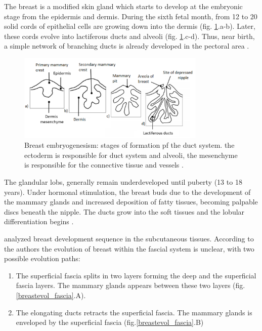 \label{section:background:introduction}
\label{section:breastanatomy}
 


The breast is a modified skin gland which starts to develop at the embryonic stage from the epidermis and dermis.  During the sixth fetal month, from 12 to 20 solid cords of epithelial cells are growing down into the dermis (fig. \ref{breastembryogenesis}.a-b). Later, these cords evolve into lactiferous ducts and alveoli (fig. \ref{breastembryogenesis}.c-d). Thus, near birth, a simple network of branching ducts is already developed in the pectoral area \citep{skandalakis_embryology_2009}.
 

 \begin{figure}[!h]
 \centering
\includegraphics[width=0.8\textwidth,keepaspectratio]{figures/breast_evolution_my.png} 
\caption[Breast embryogenesis: embryonic evolution of duct system. The epidermis is responsible for the creation of ductal system and alveoli, the dermis mesenchyme is responsible for the creation of connective tissue and vessels] {Breast embryogenesism: stages of formation pf the duct system. the ectoderm is responsible for duct system and alveoli, the mesenchyme is responsible for the connective tissue and vessels \citep{skandalakis_embryology_2009}.}
\label{breastembryogenesis}
\end{figure}


The glandular lobs, generally remain underdeveloped until puberty (13 to 18 years). Under hormonal stimulation, the breast buds due to the development of the mammary glands and increased deposition of fatty tissues, becoming palpable discs beneath the nipple. The ducts grow into the soft tissues and the lobular differentiation begins \citep{kopans2007breast}. 

\cite{kopans2007breast} analyzed breast development sequence in the subcutaneous tissues. According to the authors the evolution of breast within the fascial system is unclear, with two possible evolution paths: 
\begin{enumerate}[label=(\Alph*)]
\item The superficial fascia splits in two layers forming the deep and the superficial fascia layers. The mammary glands appears between these two layers (fig.\ref{breastevol_fascia}.A).
\item The elongating ducts retracts the superficial fascia.  The mammary glands is enveloped by the superficial fascia (fig.\ref{breastevol_fascia}.B)
\end{enumerate}

